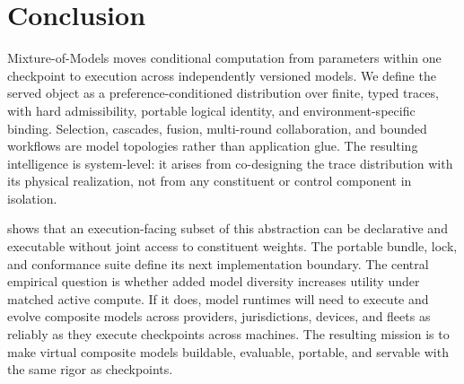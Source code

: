 \section{Conclusion}
\label{sec:conclusion}

Mixture-of-Models moves conditional computation from parameters within one
checkpoint to execution across independently versioned models. We define the
served object as a preference-conditioned distribution over finite, typed
traces, with hard admissibility, portable logical identity, and
environment-specific binding. Selection, cascades, fusion, multi-round
collaboration, and bounded workflows are model topologies rather than
application glue. The resulting intelligence is system-level: it arises from
co-designing the trace distribution with its physical realization, not from any
constituent or control component in isolation.

\vsr{} shows that an execution-facing subset of this abstraction can be
declarative and executable without joint access to constituent weights. The
portable bundle, lock, and conformance suite define its next implementation
boundary. The central empirical question is whether added model diversity
increases utility under matched active compute. If it does, model runtimes will
need to execute and evolve composite models across providers, jurisdictions,
devices, and fleets as reliably as they execute checkpoints across machines.
The resulting mission is to make virtual composite models buildable,
evaluable, portable, and servable with the same rigor as checkpoints.
